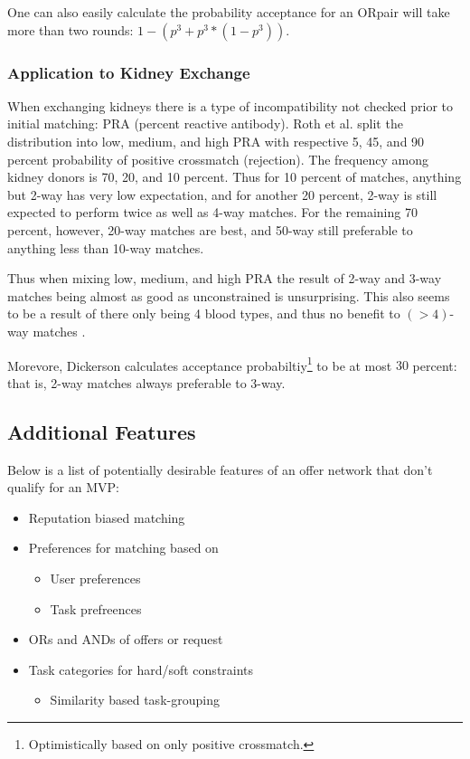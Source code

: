 \documentclass[main.tex]{subfiles}
\begin{document}
One can also easily calculate the probability acceptance for an ORpair will take more than two rounds: $1 - (p^3 + p^3 * (1 - p^3))$.

\subsubsection{Application to Kidney Exchange}
When exchanging kidneys there is a type of incompatibility not checked prior to initial matching: PRA (percent reactive antibody). Roth et al. \cite{Rot2} split the distribution into low, medium, and high PRA with respective 5, 45, and 90 percent probability of positive crossmatch (rejection). The frequency among kidney donors is 70, 20, and 10 percent. Thus for 10 percent of matches, anything but 2-way has very low expectation, and for another 20 percent, 2-way is still expected to perform twice as well as 4-way matches. For the remaining 70 percent, however, 20-way matches are best, and 50-way still preferable to anything less than 10-way matches.

Thus when mixing low, medium, and high PRA the result of 2-way and 3-way matches being almost as good as unconstrained is unsurprising. This also seems to be a result of there only being 4 blood types, and thus no benefit to $(>4)$-way matches \cite{Rot2}.

Morevore, Dickerson \cite{Dick} \cite{Dick3} calculates acceptance probabiltiy\footnote{Optimistically based on only positive crossmatch.} to be at most $30$ percent: that is, 2-way matches always preferable to 3-way.

\subsection{Additional Features}

Below is a list of potentially desirable features of an offer network that don't qualify for an MVP:
\begin{itemize}
  \item Reputation biased matching
  \item Preferences for matching based on
    \begin{itemize}
      \item User preferences
      \item Task prefreences
    \end{itemize}
  \item ORs and ANDs of offers or request
  \item Task categories for hard/soft constraints
    \begin{itemize}
      \item Similarity based task-grouping
    \end{itemize}
\end{itemize}
\end{document}
